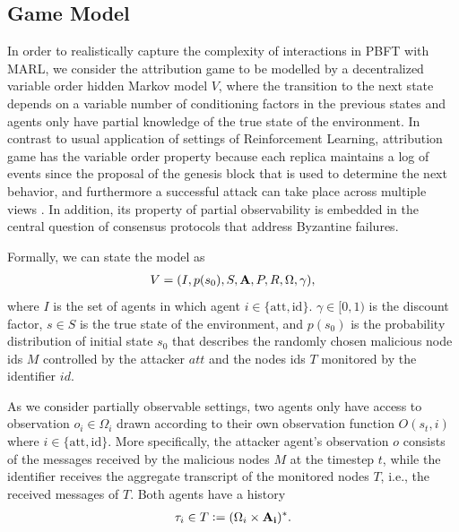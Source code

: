 \documentclass[a4paper,11pt]{article}
\begin{document}
\subsection{Game Model}
In order to realistically capture the complexity of interactions in PBFT with MARL, we consider the attribution game to be modelled by a decentralized variable order hidden Markov model $V$, where the transition to the next state depends on a variable number of conditioning factors in the previous states and agents only have partial knowledge of the true state of the environment. In contrast to usual application of settings of Reinforcement Learning, attribution game has the variable order property because each replica maintains a log of events since the proposal of the genesis block that is used to determine the next behavior, and furthermore a successful attack can take place across multiple views \cite{sheng2021bft}. In addition, its property of partial observability is embedded in the central question of consensus protocols that address Byzantine failures.

Formally, we can state the model as
\begin{align}
    V = (I, p(s_0), S, {\bf{A}}, P,  R, \Omega, \gamma),
\end{align}
where $I$ is the set of agents in which agent $i \in \{\text{att}, \text{id}\}$. $\gamma \in [0,1)$ is the discount factor, $s \in S$ is the true state of the environment, and $p(s_0)$ is the probability distribution of initial state $s_0$ that describes the randomly chosen malicious node ids $M$ controlled by the attacker $att$ and the nodes ids $T$ monitored by the identifier $id$.

As we consider partially observable settings, two agents only have access to observation $o_i \in \Omega_i$ drawn according to their own observation function $O(s_t,i)$ where $i \in \{\text{att}, \text{id}\}$.
More specifically, the attacker agent's observation $o$ consists of the messages received by the malicious nodes $M$ at the timestep $t$, while the identifier receives the aggregate transcript of the monitored nodes $T$, i.e., the received messages of $T$. Both agents have a history
\begin{align}
    \tau_i \in T \vcentcolon= (\Omega_i \times {\bf{A_i}})^*.
\end{align}
\end{document}
